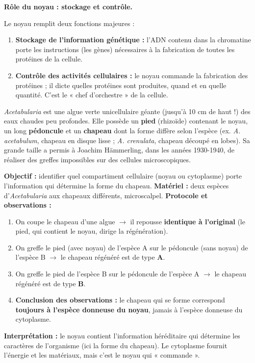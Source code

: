 \documentclass[11pt]{article}
\newcommand{\cle}[1]{{\popxbold\color{popdark}#1}}
\begin{document}
\textbf{Rôle du noyau : stockage et contrôle.}\par
Le noyau remplit deux fonctions majeures :
\begin{enumerate}
    \item \textbf{Stockage de l'information génétique :} l'ADN contenu dans la chromatine porte les instructions (les \cle{gènes}) nécessaires à la fabrication de toutes les protéines de la cellule.
    \item \textbf{Contrôle des activités cellulaires :} le noyau commande la fabrication des protéines ; il dicte quelles protéines sont produites, quand et en quelle quantité. C'est le « chef d'orchestre » de la cellule.
\end{enumerate}

\begin{savaistu}
\emph{Acetabularia} est une algue verte unicellulaire géante (jusqu'à 10 cm de haut !) des eaux chaudes peu profondes. Elle possède un \textbf{pied} (rhizoïde) contenant le noyau, un long \textbf{pédoncule} et un \textbf{chapeau} dont la forme diffère selon l'espèce (ex. \textit{A. acetabulum}, chapeau en disque lisse ; \textit{A. crenulata}, chapeau découpé en lobes). Sa grande taille a permis à Joachim Hämmerling, dans les années 1930-1940, de réaliser des greffes impossibles sur des cellules microscopiques.
\end{savaistu}

\begin{experience}
\textbf{Objectif :} identifier quel compartiment cellulaire (noyau ou cytoplasme) porte l'information qui détermine la forme du chapeau.
\textbf{Matériel :} deux espèces d'\textit{Acetabularia} aux chapeaux différents, microscalpel.
\textbf{Protocole et observations :}
\begin{enumerate}
    \item On coupe le chapeau d'une algue $\rightarrow$ il repousse \textbf{identique à l'original} (le pied, qui contient le noyau, dirige la régénération).
    \item On greffe le pied (avec noyau) de l'espèce A sur le pédoncule (sans noyau) de l'espèce B $\rightarrow$ le chapeau régénéré est de type \textbf{A}.
    \item On greffe le pied de l'espèce B sur le pédoncule de l'espèce A $\rightarrow$ le chapeau régénéré est de type \textbf{B}.
    \item \textbf{Conclusion des observations :} le chapeau qui se forme correspond \textbf{toujours à l'espèce donneuse du noyau}, jamais à l'espèce donneuse du cytoplasme.
\end{enumerate}
\textbf{Interprétation :} le noyau contient l'information héréditaire qui détermine les caractères de l'organisme (ici la forme du chapeau). Le cytoplasme fournit l'énergie et les matériaux, mais c'est le noyau qui « commande ».
\end{experience}
\end{document}
